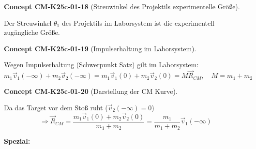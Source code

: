 \documentclass[10pt, letterpaper]{article}
\newcommand{\CustomHeading}[3]{%
  \par\medskip\noindent%
  \textbf{#1 #2} \textnormal{(#3)}.\enskip%
}
\newenvironment{CONC}[2]{\begin{unitbox}\CustomHeading{Concept}{#1}{#2}}{\end{unitbox}}
\begin{document}
\begin{center}
\end{center}

\begin{CONC}{CM-K25c-01-18}{Streuwinkel des Projektils experimentelle Größe}
Der Streuwinkel $\theta_1$ des Projektils im Laborsystem ist die experimentell zugängliche Größe.
\end{CONC}

\begin{CONC}{CM-K25c-01-19}{Impulserhaltung im Laborsystem}
Wegen Impulserhaltung (Schwerpunkt Satz) gilt im Laborsystem:
\[ m_1\vec{v}_1(-\infty) + m_2\vec{v}_2(-\infty) = m_1\vec{v}_1(0) + m_2\vec{v}_2(0) = M\vec{R}_{CM}, \quad M = m_1+m_2 \]
\end{CONC}


\begin{CONC}{CM-K25c-01-20}{Darstellung der CM Kurve}
Da das Target vor dem Stoß ruht ($\vec{v}_2(-\infty)=0$)
\[ \Rightarrow \vec{R}_{CM} = \frac{m_1\vec{v}_1(0) + m_2\vec{v}_2(0)}{m_1+m_2} = \frac{m_1}{m_1+m_2}\vec{v}_1(-\infty) \]
\end{CONC}


\textbf{Spezial:} 
\end{document}
